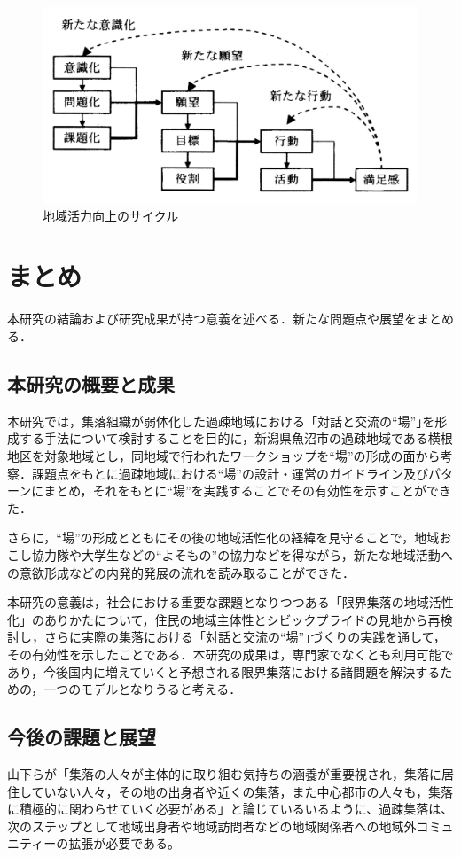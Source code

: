 \documentclass[a4paper]{jsarticle}
\begin{document}
\begin{figure}[H]
  \begin{center}
    \includegraphics[width=0.8\hsize]{./images/16.jpg}
    \caption{地域活力向上のサイクル
  }
    \label{fig:tmu_hino}
  \end{center}
\end{figure}

\newpage
\section{まとめ}
本研究の結論および研究成果が持つ意義を述べる．新たな問題点や展望をまとめる．

\subsection{本研究の概要と成果}

本研究では，集落組織が弱体化した過疎地域における「対話と交流の“場”｣を形成する手法について検討することを目的に，新潟県魚沼市の過疎地域である横根地区を対象地域とし，同地域で行われたワークショップを“場”の形成の面から考察．課題点をもとに過疎地域における“場”の設計・運営のガイドライン及びパターンにまとめ，それをもとに“場”を実践することでその有効性を示すことができた．\par
さらに，“場”の形成とともにその後の地域活性化の経緯を見守ることで，地域おこし協力隊や大学生などの“よそもの”の協力などを得ながら，新たな地域活動への意欲形成などの内発的発展の流れを読み取ることができた．\par
本研究の意義は，社会における重要な課題となりつつある「限界集落の地域活性化」のありかたについて，住民の地域主体性とシビックプライドの見地から再検討し，さらに実際の集落における「対話と交流の“場”｣づくりの実践を通して，その有効性を示したことである．本研究の成果は，専門家でなくとも利用可能であり，今後国内に増えていくと予想される限界集落における諸問題を解決するための，一つのモデルとなりうると考える．


\subsection{今後の課題と展望}
山下らが「集落の人々が主体的に取り組む気持ちの涵養が重要視され，集落に居住していない人々，その地の出身者や近くの集落，また中心都市の人々も，集落に積極的に関わらせていく必要がある」\cite{7}と論じているいるように、過疎集落は、次のステップとして地域出身者や地域訪問者などの地域関係者への地域外コミュニティーの拡張が必要である。
\end{document}
